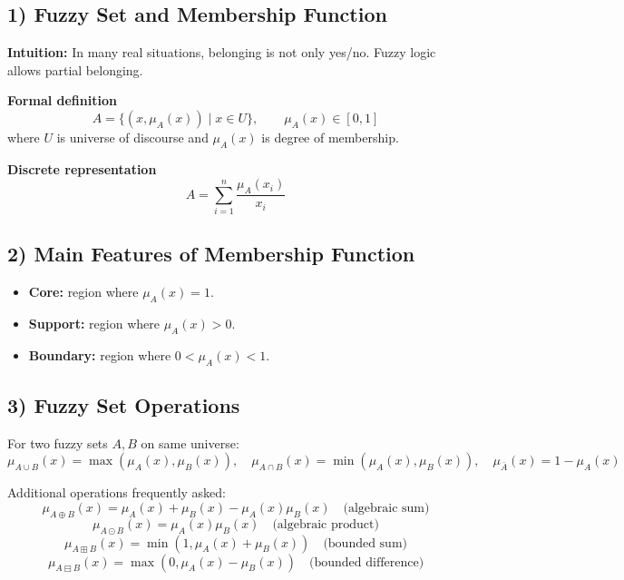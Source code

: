 \documentclass[11pt,a4paper]{article}
\begin{document}
\subsection*{1) Fuzzy Set and Membership Function}
\textbf{Intuition:} In many real situations, belonging is not only yes/no. Fuzzy logic allows partial belonging.

\textbf{Formal definition}
\[
A=\{(x,\mu_A(x))\mid x\in U\},\qquad \mu_A(x)\in[0,1]
\]
where $U$ is universe of discourse and $\mu_A(x)$ is degree of membership.

\textbf{Discrete representation}
\[
A=\sum_{i=1}^{n}\frac{\mu_A(x_i)}{x_i}
\]

\subsection*{2) Main Features of Membership Function}
\begin{itemize}
\item \textbf{Core:} region where $\mu_A(x)=1$.
\item \textbf{Support:} region where $\mu_A(x)>0$.
\item \textbf{Boundary:} region where $0<\mu_A(x)<1$.
\end{itemize}

\begin{center}
\end{center}

\subsection*{3) Fuzzy Set Operations}
For two fuzzy sets $A,B$ on same universe:
\[
\mu_{A\cup B}(x)=\max(\mu_A(x),\mu_B(x)),\quad
\mu_{A\cap B}(x)=\min(\mu_A(x),\mu_B(x)),\quad
\mu_{\bar A}(x)=1-\mu_A(x)
\]

Additional operations frequently asked:
\[
\mu_{A\oplus B}(x)=\mu_A(x)+\mu_B(x)-\mu_A(x)\mu_B(x)\quad\text{(algebraic sum)}
\]
\[
\mu_{A\odot B}(x)=\mu_A(x)\mu_B(x)\quad\text{(algebraic product)}
\]
\[
\mu_{A\boxplus B}(x)=\min(1,\mu_A(x)+\mu_B(x))\quad\text{(bounded sum)}
\]
\[
\mu_{A\boxminus B}(x)=\max(0,\mu_A(x)-\mu_B(x))\quad\text{(bounded difference)}
\]
\end{document}
